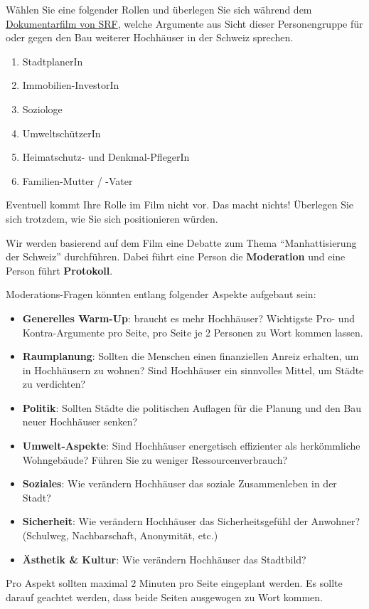 \begin{myexercise}
Wählen Sie eine folgender Rollen und überlegen Sie sich während dem \href{https://www.srf.ch/play/tv/kulturplatz/video/hochhaeuser-das-leben-in-der-vertikale?urn=urn:srf:video:a98ccb20-f5ad-46ea-8203-2688102543d4}{Dokumentarfilm von SRF}, welche Argumente aus Sicht dieser Personengruppe für oder gegen den Bau weiterer Hochhäuser in der Schweiz sprechen.
\begin{enumerate}
\item StadtplanerIn
\item Immobilien-InvestorIn
\item Soziologe
\item UmweltschützerIn
\item Heimatschutz- und Denkmal-PflegerIn
\item Familien-Mutter / -Vater
\end{enumerate}
Eventuell kommt Ihre Rolle im Film nicht vor. Das macht nichts! Überlegen Sie sich trotzdem, wie Sie sich positionieren würden.

Wir werden basierend auf dem Film eine Debatte zum Thema ``Manhattisierung der Schweiz'' durchführen. Dabei führt eine Person die \textbf{Moderation} und eine Person führt \textbf{Protokoll}.

Moderations-Fragen könnten entlang folgender Aspekte aufgebaut sein: 
\begin{itemize}
\item \textbf{Generelles Warm-Up}: braucht es mehr Hochhäuser? Wichtigste Pro- und Kontra-Argumente pro Seite, pro Seite je 2 Personen zu Wort kommen lassen.
\item \textbf{Raumplanung}: Sollten die Menschen einen finanziellen Anreiz erhalten, um in Hochhäusern zu wohnen? Sind Hochhäuser ein sinnvolles Mittel, um Städte zu verdichten?
\item \textbf{Politik}: Sollten Städte die politischen Auflagen für die Planung und den Bau neuer Hochhäuser senken?
\item \textbf{Umwelt-Aspekte}: Sind Hochhäuser energetisch effizienter als herkömmliche Wohngebäude? Führen Sie zu weniger Ressourcenverbrauch?
\item \textbf{Soziales}: Wie verändern Hochhäuser das soziale Zusammenleben in der Stadt?
\item \textbf{Sicherheit}: Wie verändern Hochhäuser das Sicherheitsgefühl der Anwohner? (Schulweg, Nachbarschaft, Anonymität, etc.)
\item \textbf{Ästhetik \& Kultur}: Wie verändern Hochhäuser das Stadtbild?
\end{itemize}

Pro Aspekt sollten maximal 2 Minuten pro Seite eingeplant werden. Es sollte darauf geachtet werden, dass beide Seiten ausgewogen zu Wort kommen.
\end{myexercise}

